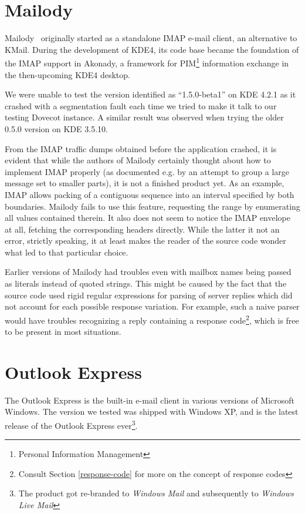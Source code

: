\documentclass[12pt,notitlepage]{report}
\begin{document}
\section{Mailody}

Mailody~\cite{mailody} originally started as a standalone IMAP e-mail client, an
alternative to KMail.  During the development of KDE4, its code base became the
foundation of the IMAP support in Akonady, a framework for PIM\footnote{Personal
Information Management} information exchange in the then-upcoming KDE4 desktop.

We were unable to test the version identified as ``1.5.0-beta1'' on KDE 4.2.1 as
it crashed with a segmentation fault each time we tried to make it talk to our
testing Dovecot instance.  A similar result was observed when trying the older
0.5.0 version on KDE 3.5.10.

From the IMAP traffic dumps obtained before the application crashed, it is
evident that while the authors of Mailody certainly thought about how to
implement IMAP properly (as documented e.g.  by an attempt to group a large
message set to smaller parts), it is not a finished product yet.  As an example,
IMAP allows packing of a contiguous sequence into an interval specified by both
boundaries.  Mailody fails to use this feature, requesting the range by
enumerating all values contained therein.  It also does not seem to notice the
IMAP envelope at all, fetching the corresponding headers directly.  While the
latter it not an error, strictly speaking, it at least makes the reader of the
source code wonder what led to that particular choice.

Earlier versions of Mailody had troubles even with mailbox names being passed as
literals instead of quoted strings.  This might be caused by the fact that the
source code used rigid regular expressions for parsing of server replies which
did not account for each possible response variation.  For example, such a naive
parser would have troubles recognizing a reply containing a response
code\footnote{Consult Section \ref{response-code} for more on the concept of
response codes}, which is free to be present in most situations.

\section{Outlook Express}

The Outlook Express is the built-in e-mail client in various versions of
Microsoft Windows.  The version we tested was shipped with Windows XP, and is
the latest release of the Outlook Express ever\footnote{The product got
re-branded to {\em Windows Mail} and subsequently to {\em Windows Live Mail}}.
\end{document}
